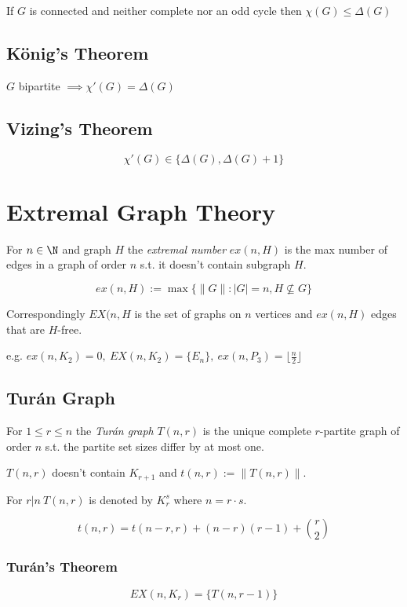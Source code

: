 If $G$ is connected and neither complete nor an odd cycle then $\chi(G) \leq \Delta(G)$

\subsection*{König's Theorem}

$G$ bipartite $\implies \chi'(G) = \Delta(G)$

\subsection*{Vizing's Theorem}

$$\chi'(G) \in \{\Delta(G), \Delta(G)+1\}$$

\section*{Extremal Graph Theory}

For $n \in \N$ and graph $H$ the \emph{extremal number} $ex(n,H)$ is the max number of edges in a graph of order $n$ s.t. it doesn't contain subgraph $H$.

$$ex(n,H):=\max\{\|G\| : |G|=n, H \not\subseteq G\}$$

Correspondingly $EX(n,H$ is the set of graphs on $n$ vertices and $ex(n,H)$ edges that are $H$-free.

\spacing

e.g. $ex(n,K_2) = 0, \ EX(n,K_2) = \{E_n\}, \ ex(n,P_3)=\lfloor\frac{n}{2}\rfloor$

\subsection*{Tur\'{a}n Graph}

For $1 \leq r \leq n$ the \emph{Tur\'{a}n graph} $T(n,r)$ is the unique complete $r$-partite graph of order $n$ s.t. the partite set sizes differ by at most one.

$T(n,r)$ doesn't contain $K_{r+1}$ and $t(n,r) := \|T(n,r)\|$.

For $r | n \ T(n,r)$ is denoted by $K_r^s$ where $n=r \cdot s$.

$$t(n,r) = t(n-r,r)+(n-r)(r-1)+{r \choose 2}$$

\subsubsection*{Tur\'{a}n's Theorem}

$$EX(n,K_r) = \{T(n,r-1)\}$$


